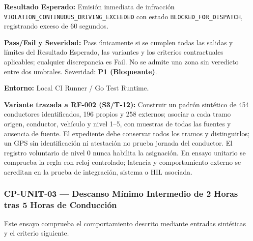 \par\noindent\textbf{Resultado Esperado:} Emisión inmediata de infracción \texttt{V\allowbreak{}I\allowbreak{}O\allowbreak{}L\allowbreak{}A\allowbreak{}T\allowbreak{}I\allowbreak{}O\allowbreak{}N\allowbreak{}\_\allowbreak{}C\allowbreak{}O\allowbreak{}N\allowbreak{}T\allowbreak{}I\allowbreak{}N\allowbreak{}U\allowbreak{}O\allowbreak{}U\allowbreak{}S\allowbreak{}\_\allowbreak{}D\allowbreak{}R\allowbreak{}I\allowbreak{}V\allowbreak{}I\allowbreak{}N\allowbreak{}G\allowbreak{}\_\allowbreak{}E\allowbreak{}X\allowbreak{}C\allowbreak{}E\allowbreak{}E\allowbreak{}D\allowbreak{}E\allowbreak{}D\allowbreak{}} con estado \texttt{B\allowbreak{}L\allowbreak{}O\allowbreak{}C\allowbreak{}K\allowbreak{}E\allowbreak{}D\allowbreak{}\_\allowbreak{}F\allowbreak{}O\allowbreak{}R\allowbreak{}\_\allowbreak{}D\allowbreak{}I\allowbreak{}S\allowbreak{}P\allowbreak{}A\allowbreak{}T\allowbreak{}C\allowbreak{}H\allowbreak{}}, registrando exceso de 60 segundos.\par
\par\noindent\textbf{Pass/Fail y Severidad:} Pass únicamente si se cumplen todas las salidas y límites del Resultado Esperado, las variantes y los criterios contractuales aplicables; cualquier discrepancia es Fail. No se admite una zona sin veredicto entre dos umbrales. Severidad: \textbf{P1 (Bloqueante)}.\par
\par\noindent\textbf{Entorno:} Local CI Runner / Go Test Runtime.\par







\par\noindent\textbf{Variante trazada a RF-002 (S3/T-12):} Construir un padrón sintético de 454 conductores identificados, 196 propios y 258 externos; asociar a cada tramo origen, conductor, vehículo y nivel 1–5, con muestras de todas las fuentes y ausencia de fuente. El expediente debe conservar todos los tramos y distinguirlos; un GPS sin identificación ni atestación no prueba jornada del conductor. El registro voluntario de nivel 0 nunca habilita la asignación. En ensayo unitario se comprueba la regla con reloj controlado; latencia y comportamiento externo se acreditan en la prueba de integración, sistema o HIL asociada.\par
\subsubsection*{CP-UNIT-03 — Descanso Mínimo Intermedio de 2 Horas tras 5 Horas de Conducción}\label{sec:9-cp-unit-03}
Este ensayo comprueba el comportamiento descrito mediante entradas sintéticas y el criterio siguiente.

